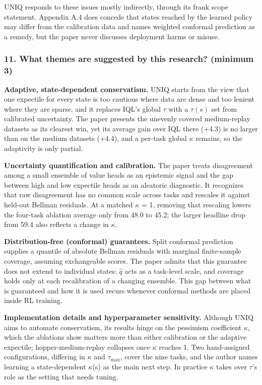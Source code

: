 \documentclass[11pt]{article}
\newcommand{\question}[1]{\subsubsection*{#1}}
\begin{document}
UNIQ responds to these issues mostly indirectly, through its frank scope statement. Appendix A.4 does concede that states reached by the learned policy may differ from the calibration data and names weighted conformal prediction as a remedy, but the paper never discusses deployment harms or misuse.

\question{11. What themes are suggested by this research? (minimum 3)}

\textbf{Adaptive, state-dependent conservatism.} UNIQ starts from the view that one expectile for every state is too cautious where data are dense and too lenient where they are sparse, and it replaces IQL's global \ensuremath{\tau} with a $\tau(s)$ set from calibrated uncertainty. The paper presents the unevenly covered medium-replay datasets as its clearest win, yet its average gain over IQL there (+4.3) is no larger than on the medium datasets (+4.4), and a per-task global \ensuremath{\kappa} remains, so the adaptivity is only partial.

\textbf{Uncertainty quantification and calibration.} The paper treats disagreement among a small ensemble of value heads as an epistemic signal and the gap between high and low expectile heads as an aleatoric diagnostic. It recognizes that raw disagreement has no common scale across tasks and rescales it against held-out Bellman residuals. At a matched \ensuremath{\kappa} = 1, removing that rescaling lowers the four-task ablation average only from 48.0 to 45.2; the larger headline drop from 59.4 also reflects a change in \ensuremath{\kappa}.

\textbf{Distribution-free (conformal) guarantees.} Split conformal prediction supplies a quantile of absolute Bellman residuals with marginal finite-sample coverage, assuming exchangeable scores. The paper admits that this guarantee does not extend to individual states: $\hat{q}$ acts as a task-level scale, and coverage holds only at each recalibration of a changing ensemble. This gap between what is guaranteed and how it is used recurs whenever conformal methods are placed inside RL training.

\textbf{Implementation details and hyperparameter sensitivity.} Although UNIQ aims to automate conservatism, its results hinge on the pessimism coefficient \ensuremath{\kappa}, which the ablations show matters more than either calibration or the adaptive expectile; hopper-medium-replay collapses once \ensuremath{\kappa} reaches 1. Two hand-assigned configurations, differing in \ensuremath{\kappa} and $\tau_{\max}$, cover the nine tasks, and the author names learning a state-dependent \ensuremath{\kappa}(s) as the main next step. In practice \ensuremath{\kappa} takes over \ensuremath{\tau}'s role as the setting that needs tuning.
\end{document}
